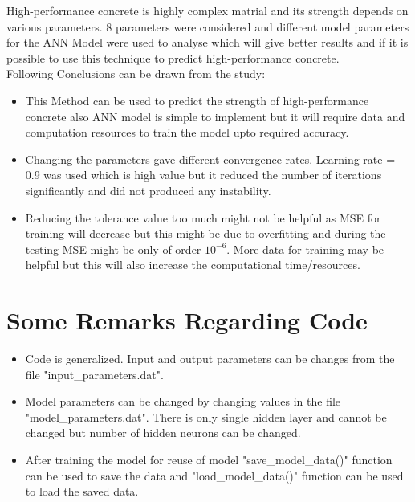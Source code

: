 High-performance concrete is highly complex matrial and its strength depends on various parameters. 8 parameters were considered and different model parameters for the ANN Model were used to analyse which will give better results and if it is possible to use this technique to predict high-performance concrete.\\
Following Conclusions can be drawn from the study:
\begin{itemize}
	\item This Method can be used to predict the strength of high-performance concrete also ANN model is simple to implement but it will require data and computation resources to train the model upto required accuracy.
	\item Changing the parameters gave different convergence rates. Learning rate = 0.9 was used which is high value but it reduced the number of iterations significantly and did not produced any instability.
	\item Reducing the tolerance value too much might not be helpful as MSE for training will decrease but this might be due to overfitting and during the testing MSE might be only of order $10^{-6}$. More data for training may be helpful but this will also increase the computational time/resources.
\end{itemize}

\section{Some Remarks Regarding Code}
\begin{itemize}
	\item Code is generalized. Input and output parameters can be changes from the file "input\_parameters.dat".
	\item Model parameters can be changed by changing values in the file "model\_parameters.dat". There is only single hidden layer and cannot be changed but number of hidden neurons can be changed.
	\item After training the model for reuse of model "save\_model\_data()" function can be used to save the data and "load\_model\_data()" function can be used to load the saved data.
\end{itemize}